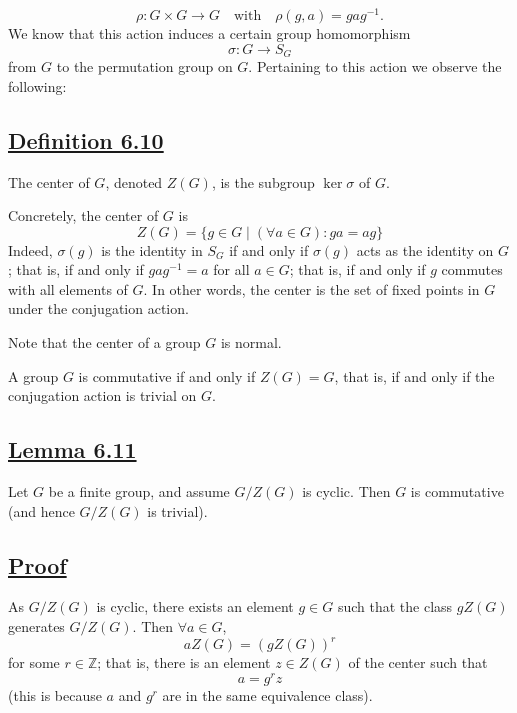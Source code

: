 \vspace{3em}

\[
\rho : G \times G \longrightarrow G \quad \text{with} \quad \rho(g,a) = gag^{-1}.
\]
We know that this action induces a certain group homomorphism
\[
\sigma : G \longrightarrow S_G
\]
from $G$ to the permutation group on $G$. Pertaining to this action we observe the following:

\vspace{1.5em}

\subsection*{\underline{Definition 6.10}}
The center of $G$, denoted $Z(G)$, is the subgroup $\ker \sigma$ of $G$.

Concretely, the center of $G$ is
\[
Z(G) = \{g \in G \mid (\forall a \in G) : ga = ag\}
\]
Indeed, $\sigma(g)$ is the identity in $S_G$ if and only if $\sigma(g)$ acts as the identity on $G$; that is, if and only if $gag^{-1} = a$ for all $a \in G$; that is, if and only if $g$ commutes with all elements of $G$. In other words, the center is the set of fixed points in $G$ under the conjugation action.


\noindent Note that the center of a group $G$ is normal.

\vspace{2em}

{\color{blue}
A group $G$ is commutative if and only if $Z(G) = G$, that is, if and only if the conjugation action is trivial on $G$.
}

\vspace{1.5em}

\subsection*{\underline{\color{blue}Lemma 6.11}}
{\color{blue}
Let $G$ be a finite group, and assume $G/Z(G)$ is cyclic. Then $G$ is commutative (and hence $G/Z(G)$ is trivial).
}

\vspace{1.5em}

\subsection*{\underline{Proof}}

As $G/Z(G)$ is cyclic, there exists an element $g \in G$ such that the class $gZ(G)$ generates $G/Z(G)$. Then $\forall a \in G$,
\[
aZ(G) = (gZ(G))^r
\]
for some $r \in \mathbb{Z}$; that is, there is an element $z \in Z(G)$ of the center such that
\[
a = g^r z
\]
(this is because $a$ and $g^r$ are in the same equivalence class).

